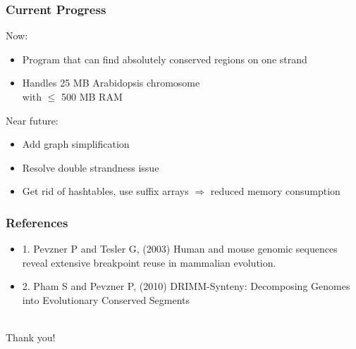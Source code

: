 \documentclass[svgnames,14pt]{beamer}
\begin{document}
\begin{frame}
\frametitle{Current Progress}
Now:
\begin{itemize}
\item Program that can find absolutely conserved regions on one strand
\item Handles 25 MB Arabidopsis chromosome \\ with  \( \le \) 500 MB RAM
\end{itemize}
Near future:
\begin{itemize}
\item Add graph simplification
\item Resolve double strandness issue
\item Get rid of hashtables, use suffix arrays \( \Rightarrow \) reduced memory consumption
\end{itemize}
\end{frame}

\begin{frame}
\frametitle{References}
\begin{itemize}
\item 1. Pevzner P and Tesler G, (2003) Human and mouse genomic sequences reveal extensive breakpoint reuse in mammalian evolution. 
\item 2. Pham S and Pevzner P, (2010) DRIMM-Synteny: Decomposing Genomes into Evolutionary Conserved Segments
\end{itemize}
\end{frame}

\begin{center}
\hfill \huge \\
\vspace{60pt}
Thank you!
\end{center}
\end{document}
